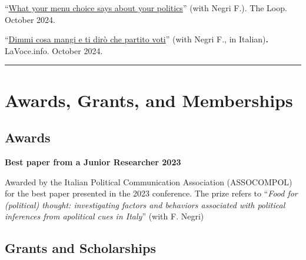 \documentclass[10pt,]{article}
\providecommand{\tightlist}{%
  \setlength{\itemsep}{0pt}\setlength{\parskip}{0pt}}
\renewenvironment{itemize}{
  \begin{list}{}{
    \setlength{\leftmargin}{1.5em}
  }
}{
  \end{list}
}
\begin{document}
\begin{itemize}
\tightlist
\item
  ``\href{https://theloop.ecpr.eu/what-your-menu-choice-says-about-your-politics/}{What
  your menu choice says about your politics}'' (with Negri F.). The
  Loop. October 2024.
\end{itemize}

\begin{itemize}
\tightlist
\item
  ``\href{https://lavoce.info/archives/106171/dimmi-cosa-mangi-e-ti-diro-che-partito-voti/}{Dimmi
  cosa mangi e ti dirò che partito voti}'' (with Negri F., in
  Italian)\textbf{.} LaVoce.info. October 2024.
\end{itemize}

\bigskip \hrule

\section{Awards, Grants, and
Memberships}\label{awards-grants-and-memberships}

\subsection{Awards}\label{awards}

\begin{itemize}
\tightlist
\item
  \textbf{Best paper from a Junior Researcher 2023}

  \begin{itemize}
  \tightlist
  \item
    Awarded by the Italian Political Communication Association
    (ASSOCOMPOL) for the best paper presented in the 2023 conference.
    The prize refers to ``\emph{Food for (political) thought:
    investigating factors and behaviors associated with political
    inferences from apolitical cues in Italy}'' (with F. Negri)
  \end{itemize}
\end{itemize}

\subsection{Grants and Scholarships}\label{grants-and-scholarships}
\end{document}
